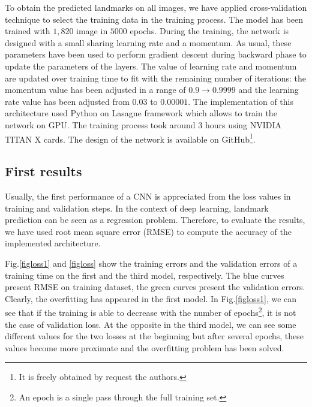 \documentclass{article} %
\begin{document}
\begin{multicols}{2}
To obtain the predicted landmarks on all images, we have applied cross-validation technique to select the training data in the training process. The model has been trained with $1,820$ image in $5000$ epochs. During the training, the network is designed with a small sharing learning rate and a momentum. As usual, these parameters have been used to perform gradient descent during backward phase to update the parameters of the layers. The value of learning rate and momentum are updated over training time to fit with the remaining number of iterations: the momentum value has been adjusted in a range of $0.9 \rightarrow 0.9999$ and the learning rate value has been adjusted from $0.03$ to $0.00001$. The implementation of this architecture used Python on Lasagne framework \cite{lasagne} which allows to train the network on GPU. The training process took around 3 hours using NVIDIA TITAN X cards. The design of the network is available on GitHub\footnote{It is freely obtained by request the authors.}.


\subsection{First results}
Usually, the first performance of a CNN is appreciated from the loss values in training and validation steps. In the context of deep learning, landmark prediction can be seen as a regression problem. Therefore, to evaluate the results, we have used root mean square error (RMSE) to compute the accuracy of the implemented architecture. 

Fig.\ref{figloss1} and \ref{figloss} show the training errors and the validation errors of a training time on the first and the third model, respectively. The blue curves present RMSE on training dataset, the green curves present the validation errors. Clearly, the overfitting has appeared in the first model. In Fig.\ref{figloss1}, we can see that if the training is able to decrease with the number of epochs\footnote{An epoch is a single pass through the full training set.}, it is not the case of validation loss. At the opposite in the third model, we can see some different values for the two losses at the beginning but after several epochs, these values become more proximate and the overfitting problem has been solved.


\end{multicols}
\end{document}
